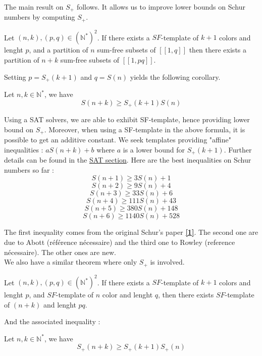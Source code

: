 The main result on \(S_+\) follows. It allows us to improve lower bounds on Schur numbers by computing \(S_+\).

\begin{theorem}
	Let $(n,k), (p,q) \in (\mathbb{N}^*)^2$. If there exists a \(SF\)-template of $k+1$ colors and lenght \(p\),
	and a partition of $n$ sum-free subsets of $[\![1,q]\!]$ then there exists a partition of $n+k$ sum-free subsets of $[\![1,pq]\!]$.
\end{theorem}

Setting $p = S_+(k+1)$ and $q = S(n)$ yields the following corollary. 

\begin{corollary}
	Let \(n, k \in \mathbb{N}^*\), we have \\
	\[ S(n+k) \geqslant S_+(k+1)S(n) \]
\end{corollary}

Using a SAT solvers, we are able to exhibit SF-template,
hence providing lower bound on \(S_+\). Moreover, when using 
a SF-template in the above formula, it is possible to get an additive constant. We seek templates providing "affine"
inequalities : \(aS(n+k) + b \) where \(a\) is a lower bound for \(S_+(k+1)\). Further details can be found in the \hyperref[SAT]{SAT section}.
Here are the best inequalities on Schur numbers so far :
\[ S(n+1) \geqslant 3S(n) + 1 \]
\[ S(n+2) \geqslant 9S(n) + 4 \]
\[ S(n+3) \geqslant 33S(n) + 6 \]
\[ S(n+4) \geqslant 111S(n) + 43 \]
\[ S(n+5) \geqslant 380S(n) + 148 \]
\[ S(n+6) \geqslant 1140S(n) + 528 \]

The first inequality comes from the original Schur's paper \hyperlink{label1}{\textbf{[1]}}. The second one are due to Abott (référence nécessaire) 
and the third one to Rowley (reference nécessaire). The other ones are new. \\

We also have a similar theorem where only \(S_+\) is involved. 

\begin{theorem}
	Let $(n,k), (p,q) \in (\mathbb{N}^*)^2$. If there exists a \(SF\)-template of $k+1$ colors and lenght \(p\),
	and \(SF\)-template of \(n\) color and lenght \(q\), then there exists \(SF\)-template of \((n+k)\) and lenght \(pq\).
\end{theorem}

And the associated inequality :

\begin{corollary}
	Let \(n, k \in \mathbb{N}^*\), we have \\
	\[ S_+(n+k) \geqslant S_+(k+1)S_+(n) \]
\end{corollary}


